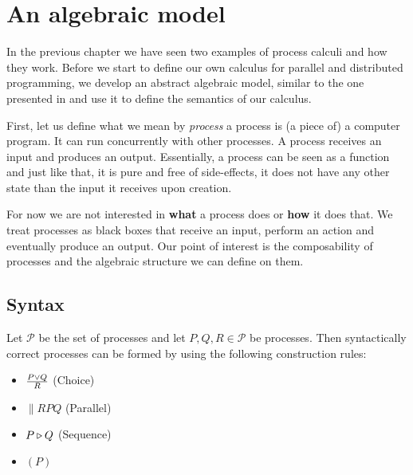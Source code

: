 \chapter{An algebraic model}
\label{chp:algebraic_model}
In the previous chapter we have seen two examples of process calculi and how they work. Before we start to define our own calculus for parallel and distributed programming, we develop an abstract algebraic model, similar to the one presented in \cite{Hoare:2012:LPU:2368298.2368301} and use it to define the semantics of our calculus.

First, let us define what we mean by \textit{process} a process is (a piece of) a computer program. It can run concurrently with other processes. A process receives an input and produces an output. Essentially, a process can be seen as a function and just like that, it is pure and free of side-effects, it does not have any other state than the input it receives upon creation.

For now we are not interested in \textbf{what} a process does or \textbf{how} it does that. We treat processes as black boxes that receive an input, perform an action and eventually produce an output. Our point of interest is the composability of processes and the algebraic structure we can define on them.

\section{Syntax}
\label{chp:syntax}
Let $\mathcal{P}$ be the set of processes and let $P, Q, R \in \mathcal{P}$ be processes. Then syntactically correct processes can be formed by using the following construction rules:
\begin{itemize}
  \item $\choice{R}{P}{Q}$ \hspace*{2.7em} (Choice)
  \item $\parallel{R}{P}{Q}$ \hspace*{2.8em} (Parallel)
  \item $\sequence{P}{Q}$ \hspace*{2.2em} (Sequence)
  \item $\left( P \right)$
\end{itemize}

